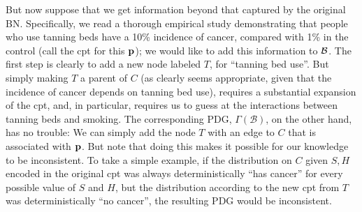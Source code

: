 \documentclass{article}
\numberwithin{equation}{section}
\begin{document}
\begin{example}[emulating a BN]
        But now suppose that we get information beyond that captured by the
original BN.  Specifically, we read a thorough empirical study 
        demonstrating that people who use tanning beds have a
                10\% incidence of cancer, compared with 1\% in the
                control (call the cpt for this $\mathbf p$); we would
                like to add this information to $\cal B$.  
		The first step is clearly to add a new node labeled
                $T$, for ``tanning bed use''.  But simply making $T$ a
                parent of $C$ (as clearly seems appropriate, given
                that 
                the incidence of cancer depends on tanning bed use),
                requires a substantial expansion of the cpt, and, in
                particular, requires us to guess at the interactions
                between tanning beds and smoking.  
%		
		The corresponding PDG, $\Gamma(\mathcal B)$, on the other hand, has no trouble:
		We can simply add the node $T$ with an edge to $C$ that is associated with $\mathbf p$. 
%		
                But note that doing this makes it possible for our
                knowledge to be 
                inconsistent. To take a simple example, if the
                distribution on $C$ 
                given $S,H$ encoded in the original cpt was always
                deterministically ``has cancer'' for every possible
                value of $S$ and $H$, but the distribution according
                to the new cpt from $T$ was deterministically ``no
                cancer'', the resulting PDG would be inconsistent.  
		


\end{example}
\end{document}
